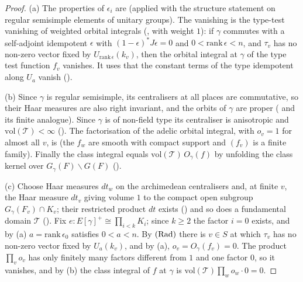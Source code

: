 \begin{proof}
(a) The properties of $\epsilon_i$ are 
(applied with the structure statement  on regular
semisimple elements of unitary groups). The vanishing is the type-test vanishing of weighted orbital integrals
(, with weight $1$): if $\gamma$ commutes with a
self-adjoint idempotent $\epsilon$ with $(1-\epsilon)^*J\epsilon=0$ and $0<\mathrm{rank}\,\epsilon<n$, and $\tau_v$ has no
non-zero vector fixed by $U_{\mathrm{rank}\,\epsilon}(k_v)$, then the orbital integral at $\gamma$ of the type test function
$f_v$ vanishes. It uses that the constant terms of the type idempotent along $U_a$ vanish
().

(b) Since $\gamma$ is regular semisimple, its centralisers at all places are commutative, so their Haar measures are also
right invariant, and the orbits of $\gamma$ are proper ( and its finite
analogue). Since $\gamma$ is of non-field type its centraliser is anisotropic and $\mathrm{vol}(\mathcal T)<\infty$
(). The factorisation of the adelic orbital integral, with $o_v=1$ for
almost all $v$, is  (the $f_w$ are smooth with compact support and $(f_v)$ is a
finite family). Finally the class integral equals $\mathrm{vol}(\mathcal T)\,O_\gamma(f)$ by unfolding the class kernel
over $G_\gamma(F)\backslash G(F)$ ().

(c) Choose Haar measures $dt_w$ on the archimedean centralisers and, at finite $v$, the Haar measure $dt_v$ giving volume
$1$ to the compact open subgroup $G_\gamma(F_v)\cap K_v$; their restricted product $dt$ exists
() and so does a fundamental domain $\mathcal T$
(). Fix $e\colon E[\gamma]^+\cong\prod_{i<k}K_i$; since $k\ge2$ the
factor $i=0$ exists, and by (a) $a=\mathrm{rank}\,\epsilon_0$ satisfies $0<a<n$. By $\textup{(Rad)}$ there is $v\in S$ at
which $\tau_v$ has no non-zero vector fixed by $U_a(k_v)$, and by (a), $o_v=O_\gamma(f_v)=0$. The product $\prod_vo_v$ has
only finitely many factors different from $1$ and one factor $0$, so it vanishes, and by (b) the class integral of $f$ at
$\gamma$ is $\mathrm{vol}(\mathcal T)\prod_wo_w\cdot0=0$.
\end{proof}


